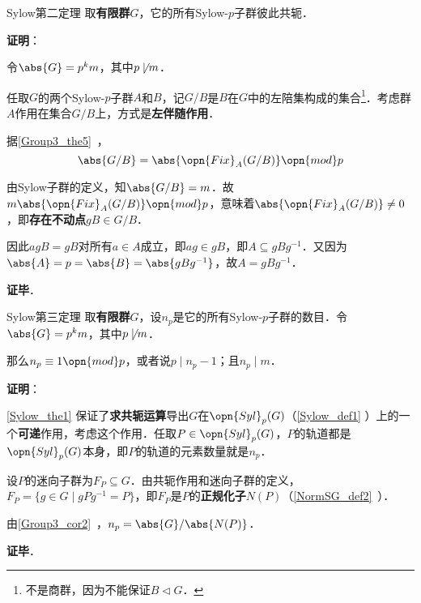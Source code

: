 \begin{theorem}{Sylow第二定理}\label{Sylow_the1}
取\textbf{有限群}$G$，它的所有Sylow-$p$子群彼此共轭．
\end{theorem}

\textbf{证明}：

令$\abs{G}=p^km$，其中$p\not\mid m$．

任取$G$的两个Sylow-$p$子群$A$和$B$，记$G/B$是$B$在$G$中的左陪集构成的集合\footnote{不是商群，因为不能保证$B\vartriangleleft G$．}．考虑群$A$作用在集合$G/B$上，方式是\textbf{左伴随作用}．

据\autoref{Group3_the5}~，
\begin{equation}
\abs{G/B} = \abs{\opn{Fix}_A(G/B)} \opn{mod} p
\end{equation}

由Sylow子群的定义，知$\abs{G/B}=m$．故$m\abs{\opn{Fix}_A(G/B)} \opn{mod} p$，意味着$\abs{\opn{Fix}_A(G/B)}\neq 0$，即\textbf{存在不动点}$gB\in G/B$．

因此$agB=gB$对所有$a\in A$成立，即$ag\in gB$，即$A\subseteq gBg^{-1}$．又因为$\abs{A}=p=\abs{B}=\abs{gBg^{-1}}$，故$A=gBg^{-1}$．


\textbf{证毕}．




\begin{theorem}{Sylow第三定理}
取\textbf{有限群}$G$，设$n_p$是它的所有Sylow-$p$子群的数目．令$\abs{G}=p^km$，其中$p\not\mid m$．

那么$n_p\equiv 1\opn{mod} p$，或者说$p\mid n_p-1$；且$n_p\mid m$．
\end{theorem}

\textbf{证明}：



\autoref{Sylow_the1} 保证了\textbf{求共轭运算}导出$G$在$\opn{Syl}_p(G)$（\autoref{Sylow_def1} ）上的一个\textbf{可递}作用，考虑这个作用．任取$P\in \opn{Syl}_p(G)$，$P$的轨道都是$\opn{Syl}_p(G)$本身，即$P$的轨道的元素数量就是$n_p$．

设$P$的迷向子群为$F_P\subseteq G$．由共轭作用和迷向子群的定义，$F_P=\{g\in G\mid gPg^{-1}=P\}$，即$F_P$是$P$的\textbf{正规化子}$N(P)$（\autoref{NormSG_def2}~）．

由\autoref{Group3_cor2}~，$n_p=\abs{G}/\abs{N(P)}$．

\textbf{证毕}．




















